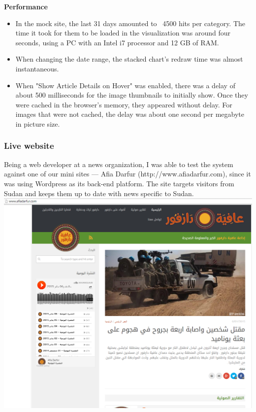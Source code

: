 \documentclass[12pt]{article}
\begin{document}
{\noindent\textbf{Performance} 
\begin{itemize}
\item In the mock site, the last 31 days amounted to ~4500 hits per category. The time it took for them to be loaded in the visualization was around four seconds, using a PC with an Intel i7 processor and 12 GB of RAM.
\item When changing the date range, the stacked chart's redraw time was almost instantaneous.
\item When "Show Article Details on Hover" was enabled, there was a delay of about 500 milliseconds for the image thumbnails to initially show. Once they were cached in the browser's memory, they appeared without delay. For images that were not cached, the delay was about one second per megabyte in picture size.
\end{itemize}

\newpage

\subsubsection{Live website}
Being a web developer at a news organization, I was able to test the system against one of our mini sites --- Afia Darfur (http://www.afiadarfur.com), since it was using Wordpress as its back-end platform. The site targets visitors from Sudan and keeps them up to date with news specific to Sudan. \\

\noindent\includegraphics[scale=0.4]{img/afiadarfur_main} \\

}
\end{document}
